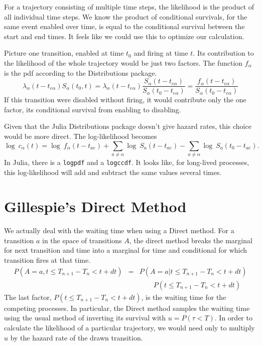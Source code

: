 \documentclass{article}
\begin{document}
For a trajectory consisting of multiple time steps, the likelihood is the product of all individual time steps. We know the product of conditional survivals, for the same event enabled over time, is equal to the conditional survival between the start and end times. It feels like we could use this to optimize our calculation.

Picture one transition, enabled at time $t_0$ and firing at time $t$. Its contribution to the likelihood of the whole trajectory would be just two factors. The function $f_\alpha$ is the pdf according to the Distributions package.
\begin{equation}
	\lambda_{\alpha}(t-t_{e\alpha})S_{\alpha}(t_0,t)
	=\lambda_{\alpha}(t-t_{e\alpha})\frac{S_{\alpha}(t-t_{e\alpha})}{S_{\alpha}(t_0-t_{e\alpha})}
	=\frac{f_{\alpha}(t-t_{e\alpha})}{S_{\alpha}(t_0-t_{e\alpha})}
\end{equation}
If this transition were disabled without firing, it would contribute only the one factor, its conditional survival from enabling to disabling.


Given that the Julia Distributions package doesn't give hazard rates, this choice would be more direct. The log-likelihood becomes
\begin{equation}
  \log\:c_{\alpha}(t) = \log\:f_\alpha(t-t_{ae})+\sum_{a\ne\alpha} \log\:S_a(t-t_{ae}) - \sum_{a\ne\alpha} \log\:S_a(t_0-t_{ae}).
\end{equation}
In Julia, there is a \texttt{logpdf} and a \texttt{logccdf}. It looks like, for long-lived processes, this log-likelihood will add and subtract the same values several times.


\section{Gillespie's Direct Method}

We actually deal with the waiting time when using a Direct method. For a transition $a$ in the space of transitions $A$, the direct method breaks the marginal for next transition and time into a marginal for time and conditional for which transition fires at that time.
\begin{eqnarray*}
	P(A=a, t\le T_{n+1}-T_n<t+dt) &=& P(A=a|t\le T_{n+1}-T_n<t+dt) \\
	& & \qquad P(t\le T_{n+1}-T_n<t+dt)
\end{eqnarray*}
The last factor, $P(t\le T_{n+1}-T_n<t+dt)$, is the waiting time for the competing processes. In particular, the Direct method samples the waiting time using the usual method of inverting its survival with $u=P(\tau<T)$. In order to calculate the likelihood of a particular trajectory, we would need only to multiply $u$ by the hazard rate of the drawn transition.
\end{document}
